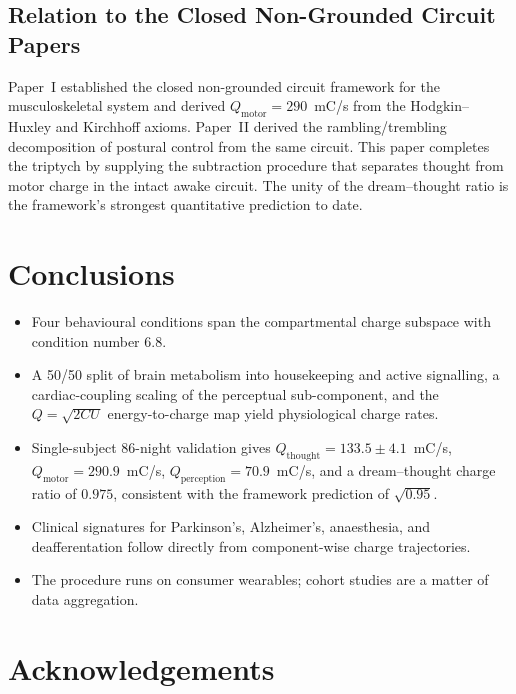\documentclass[11pt,twocolumn,a4paper]{article}
\theoremstyle{definition}
\theoremstyle{remark}
\newcommand{\Qth}{Q_{\mathrm{thought}}}
\newcommand{\Qmo}{Q_{\mathrm{motor}}}
\newcommand{\Qpe}{Q_{\mathrm{perception}}}
\begin{document}
\subsection{Relation to the Closed Non-Grounded Circuit Papers}

Paper~I \citep{sachikonye2026musculo} established the closed
non-grounded circuit framework for the musculoskeletal system and
derived $\Qmo=290$~mC/s from the Hodgkin--Huxley and Kirchhoff axioms.
Paper~II \citep{sachikonye2026rambling} derived the
rambling/trembling decomposition of postural control from the same
circuit. This paper completes the triptych by supplying the
subtraction procedure that separates thought from motor charge in
the intact awake circuit. The unity of the dream--thought ratio is
the framework's strongest quantitative prediction to date.

\section{Conclusions}

\begin{itemize}[leftmargin=1.3em]
  \item Four behavioural conditions span the compartmental charge
  subspace with condition number $6.8$.
  \item A 50/50 split of brain metabolism into housekeeping and
  active signalling, a cardiac-coupling scaling of the perceptual
  sub-component, and the $Q=\sqrt{2CU}$ energy-to-charge map yield
  physiological charge rates.
  \item Single-subject 86-night validation gives
  $\Qth=133.5\pm 4.1$~mC/s, $\Qmo=290.9$~mC/s,
  $\Qpe=70.9$~mC/s, and a dream--thought charge ratio of
  $0.975$, consistent with the framework prediction of
  $\sqrt{0.95}$.
  \item Clinical signatures for Parkinson's, Alzheimer's, anaesthesia,
  and deafferentation follow directly from component-wise charge
  trajectories.
  \item The procedure runs on consumer wearables; cohort studies are
  a matter of data aggregation.
\end{itemize}

\section*{Acknowledgements}
\end{document}
